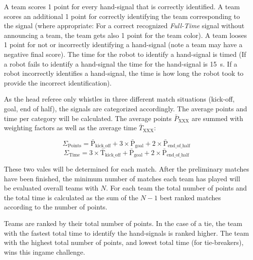 A team scores 1 point for every hand-signal that is correctly identified. A team scores an additional 1 point for correctly identifying the team corresponding to the signal (where appropriate: For a correct recognized \textit{Full-Time} signal without announcing a team, the team gets also 1 point for the team color). A team looses 1 point for not or incorrectly identifying a hand-signal (note a team may have a negative final score). The time for the robot to identify a hand-signal is timed (If a robot fails to identify a hand-signal the time for the hand-signal is \qty{15}{\second}. If a robot incorrectly identifies a hand-signal, the time is how long the robot took to provide the incorrect identification).

As the head referee only whistles in three different match situations (kick-off, goal, end of half), the signals are categorized accordingly. The average points and time per category will be calculated. The average points $\bar{P}_{\mathrm{XXX}}$ are summed with weighting factors as well as the average time $\bar{T}_{\mathrm{XXX}}$:

\begin{equation*}
    \Sigma_\mathrm{Points} = \bar{\mathrm{P}}_{\mathrm{kick\_off}} + 3 \times \bar{\mathrm{P}}_{\mathrm{goal}} + 2 \times \bar{\mathrm{P}}_{\mathrm{end\_of\_half}}
\end{equation*}
\begin{equation*}
    \Sigma_\mathrm{Time} = 3 \times \bar{\mathrm{T}}_{\mathrm{kick\_off}} + \bar{\mathrm{P}}_{\mathrm{goal}} + 2 \times \bar{\mathrm{P}}_{\mathrm{end\_of\_half}}
\end{equation*}

These two vales will be determined for each match. After the preliminary matches have been finished, the minimum number of matches each team has played will be evaluated overall teams with $N$. For each team the total number of points and the total time is calculated as the sum of the $N - 1$ best ranked matches according to the number of points.

Teams are ranked by their total number of points. In the case of a tie, the team with the fastest total time to identify the hand-signals is ranked higher. The team with the highest total number of points, and lowest total time (for tie-breakers), wins this ingame challenge.